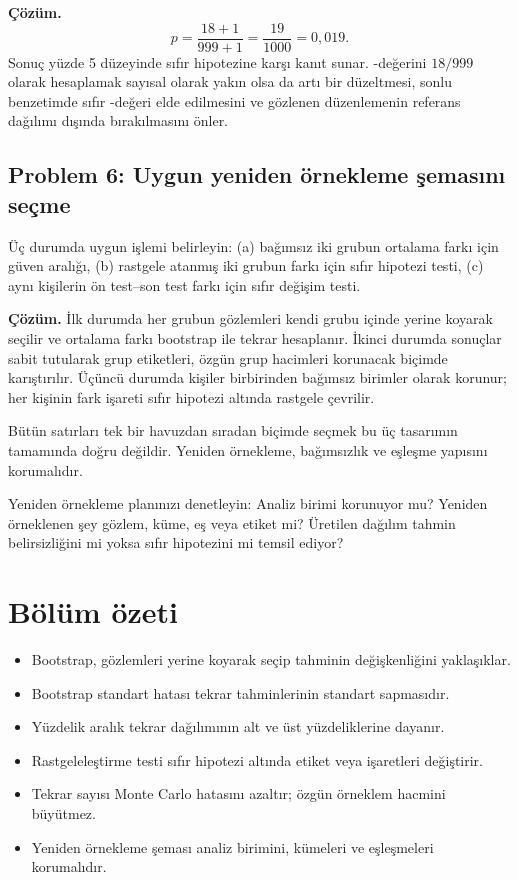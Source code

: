 \textbf{Çözüm.}
\[
p=\frac{18+1}{999+1}=\frac{19}{1000}=0{,}019.
\]
Sonuç yüzde 5 düzeyinde sıfır hipotezine karşı kanıt sunar. \pval-değerini
$18/999$ olarak hesaplamak sayısal olarak yakın olsa da artı bir düzeltmesi,
sonlu benzetimde sıfır \pval-değeri elde edilmesini ve gözlenen düzenlemenin
referans dağılımı dışında bırakılmasını önler.

\subsection*{Problem 6: Uygun yeniden örnekleme şemasını seçme}

Üç durumda uygun işlemi belirleyin: (a) bağımsız iki grubun ortalama farkı
için güven aralığı, (b) rastgele atanmış iki grubun farkı için sıfır hipotezi
testi, (c) aynı kişilerin ön test--son test farkı için sıfır değişim testi.

\textbf{Çözüm.} İlk durumda her grubun gözlemleri kendi grubu içinde yerine
koyarak seçilir ve ortalama farkı bootstrap ile tekrar hesaplanır. İkinci
durumda sonuçlar sabit tutularak grup etiketleri, özgün grup hacimleri
korunacak biçimde karıştırılır. Üçüncü durumda kişiler birbirinden bağımsız
birimler olarak korunur; her kişinin fark işareti sıfır hipotezi altında
rastgele çevrilir.

Bütün satırları tek bir havuzdan sıradan biçimde seçmek bu üç tasarımın
tamamında doğru değildir. Yeniden örnekleme, bağımsızlık ve eşleşme yapısını
korumalıdır.



\begin{etkinlik}
Yeniden örnekleme planınızı denetleyin: Analiz birimi korunuyor mu? Yeniden
örneklenen şey gözlem, küme, eş veya etiket mi? Üretilen dağılım tahmin
belirsizliğini mi yoksa sıfır hipotezini mi temsil ediyor?
\end{etkinlik}

\section{Bölüm özeti}

\begin{itemize}
  \item Bootstrap, gözlemleri yerine koyarak seçip tahminin değişkenliğini yaklaşıklar.
  \item Bootstrap standart hatası tekrar tahminlerinin standart sapmasıdır.
  \item Yüzdelik aralık tekrar dağılımının alt ve üst yüzdeliklerine dayanır.
  \item Rastgeleleştirme testi sıfır hipotezi altında etiket veya işaretleri değiştirir.
  \item Tekrar sayısı Monte Carlo hatasını azaltır; özgün örneklem hacmini büyütmez.
  \item Yeniden örnekleme şeması analiz birimini, kümeleri ve eşleşmeleri korumalıdır.
\end{itemize}

